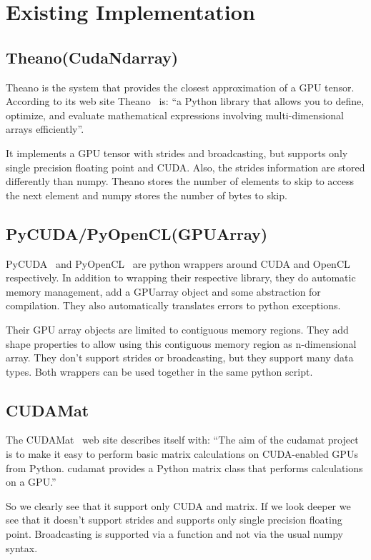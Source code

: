 \documentclass{article} %
\begin{document}
\section{Existing Implementation}
\subsection{Theano(CudaNdarray)}
Theano is the system that provides the closest approximation of a GPU tensor. According to its web site Theano~\citep{bergstra+al:2010-scipy} is:
``a Python library that allows you to define, optimize, and evaluate mathematical expressions involving multi-dimensional arrays efficiently''.

It implements a GPU tensor with strides and broadcasting, but supports only single precision floating point and CUDA. Also, the strides information are stored differently than numpy. Theano stores the number of elements to skip to access the next element and numpy stores the number of bytes to skip.

\subsection{PyCUDA/PyOpenCL(GPUArray)}
PyCUDA~\citep{kloeckner_pycuda_2009} and PyOpenCL~\citep{kloeckner_pycuda_2009} are python wrappers around CUDA and OpenCL respectively. In addition to wrapping their respective library, they do automatic memory management, add a GPUarray object and some abstraction for compilation. They also automatically translates errors to python exceptions.

Their GPU array objects are limited to contiguous memory regions. They add shape properties to allow using this contiguous memory region as n-dimensional array. They don't support strides or broadcasting, but they support many data types. Both wrappers can be used together in the same python script.

\subsection{CUDAMat}
The CUDAMat~\citep{cudamat-TR2009} web site describes itself with: ``The aim of the cudamat project is to make it easy to perform basic matrix calculations on CUDA-enabled GPUs from Python. cudamat provides a Python matrix class that performs calculations on a GPU.''

So we clearly see that it support only CUDA and matrix. If we look deeper we see that it doesn't support strides and supports only single precision floating point. Broadcasting is supported via a function and not via the usual numpy syntax.
\end{document}

